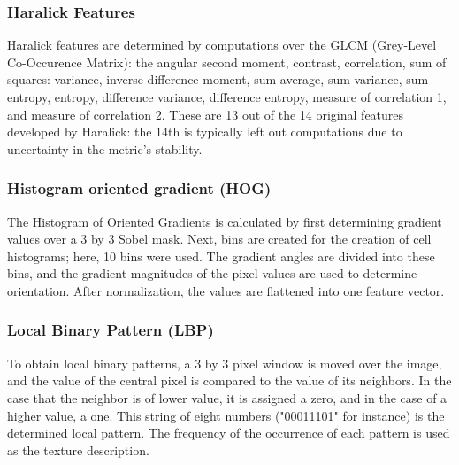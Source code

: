 
\subsubsection{Haralick Features}

Haralick features are determined by computations over the GLCM (Grey-Level Co-Occurence Matrix): the angular second moment, contrast, correlation, sum of squares: variance, inverse difference moment, sum average, sum variance, sum entropy, entropy, difference variance, difference entropy, measure of correlation 1, and measure of correlation 2. These are 13 out of the 14 original features developed by Haralick: the 14th is typically left out computations due to uncertainty in the metric's stability. 

\subsubsection{Histogram oriented gradient (HOG)}

The Histogram of Oriented Gradients is calculated by first determining gradient values over a 3 by 3 Sobel mask. Next, bins are created for the creation of cell histograms; here, 10 bins were used. The gradient angles are divided into these bins, and the gradient magnitudes of the pixel values are used to determine orientation. After normalization, the values are flattened into one feature vector. 

\subsubsection{Local Binary Pattern (LBP)}

To obtain local binary patterns, a 3 by 3 pixel window is moved over the image, and the value of the central pixel is compared to the value of its neighbors. In the case that the neighbor is of lower value, it is assigned a zero, and in the case of a higher value, a one. This string of eight numbers ("00011101" for instance) is the determined local pattern. The frequency of the occurrence of each pattern is used as the texture description. 
  
  

  
  
  
  